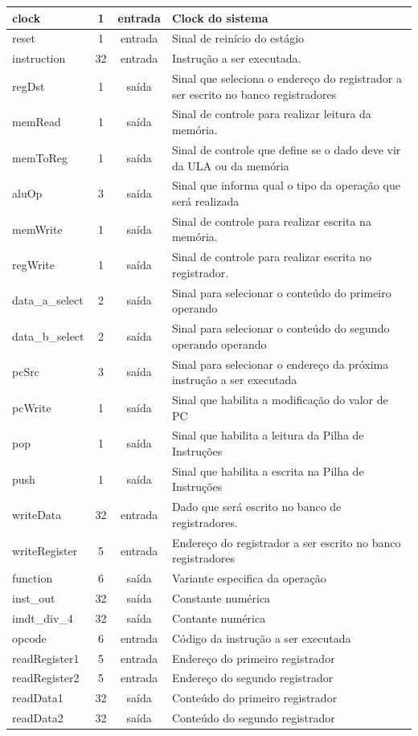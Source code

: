 \begin{center}
\begin{longtable}[pos]{| l | c | c | m{7cm} |}
			clock & 1 & entrada & Clock do sistema \\ \hline
			reset & 1 & entrada & Sinal de reinício do estágio\\ \hline
			instruction & 32 & entrada & Instrução a ser executada. \\ \hline
			regDst & 1 & saída & Sinal que seleciona o endereço do registrador a ser escrito no banco registradores \\ \hline
			memRead & 1 & saída & Sinal de controle para realizar leitura da
			memória.
			\\ \hline
			memToReg & 1 & saída & Sinal de controle que define se o dado
			deve vir da ULA ou da memória
			\\ \hline
			aluOp & 3 & saída & Sinal que informa qual o tipo da operação que será realizada \\ \hline
			memWrite & 1 & saída & Sinal de controle para realizar escrita na
			memória. \\ \hline
			regWrite & 1 & saída & Sinal de controle para realizar escrita no
			registrador. \\ \hline
			data\_a\_select & 2 & saída &  Sinal para selecionar o conteúdo do primeiro operando \\ \hline
			data\_b\_select & 2 & saída & Sinal para selecionar o conteúdo do segundo operando operando \\ \hline
			pcSrc & 3 & saída & Sinal para selecionar o endereço da próxima instrução a ser executada \\ \hline
			pcWrite & 1 & saída & Sinal que habilita a modificação do valor de PC \\ \hline
			pop & 1 & saída & Sinal que habilita a leitura da Pilha de Instruções \\ \hline
			push & 1 & saída & Sinal que habilita a escrita na Pilha de Instruções \\ \hline
			writeData & 32 & entrada & Dado que será escrito no banco de registradores. \\ \hline
			writeRegister & 5 & entrada & Endereço do registrador a ser escrito no banco registradores \\ \hline
			function & 6 & saída & Variante especifica da operação \\\hline
			inst\_out & 32 & saída & Constante numérica  \\ \hline
			imdt\_div\_4 & 32 & saída & Contante numérica \\\hline
			opcode & 6 & entrada & Código da instrução a ser executada \\ \hline
			readRegister1 & 5 & entrada & Endereço do primeiro registrador \\ \hline
			readRegister2 & 5 & entrada & Endereço do segundo registrador\\ \hline 
			readData1 & 32 & saída & Conteúdo do primeiro registrador \\ \hline 
			readData2 & 32 & saída & Conteúdo do segundo registrador \\ \hline
		\end{longtable}
	\end{center}
    
